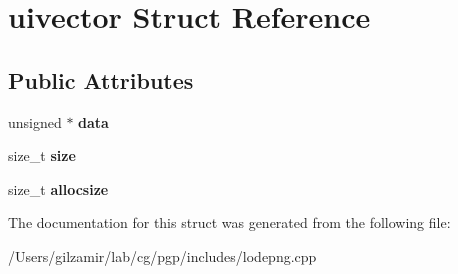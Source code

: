 \hypertarget{structuivector}{}\section{uivector Struct Reference}
\label{structuivector}
\subsection*{Public Attributes}
\begin{DoxyCompactItemize}
\item 
\mbox{\label{structuivector_a427d761df4bb4f0f19b4a973fc224c78}} 
unsigned $\ast$ {\bfseries data}
\item 
\mbox{\label{structuivector_aa999025945f0c93d0461192475ae2720}} 
size\+\_\+t {\bfseries size}
\item 
\mbox{\label{structuivector_aac0395a9ad397ae7a28219561ab49ffa}} 
size\+\_\+t {\bfseries allocsize}
\end{DoxyCompactItemize}


The documentation for this struct was generated from the following file\+:\begin{DoxyCompactItemize}
\item 
/\+Users/gilzamir/lab/cg/pgp/includes/lodepng.\+cpp\end{DoxyCompactItemize}
